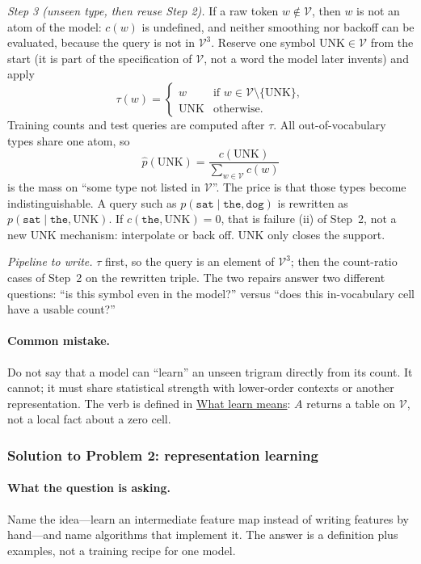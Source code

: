 \documentclass[11pt,a4paper]{article}
\newcommand{\jump}[2]{\hyperref[#1]{#2}}
\theoremstyle{definition}
\begin{document}
\textit{Step 3 (unseen type, then reuse Step 2).}
If a raw token \(w\notin\mathcal{V}\), then \(w\) is not an atom of the model: \(c(w)\) is undefined, and neither smoothing nor backoff can be evaluated, because the query is not in \(\mathcal{V}^3\). Reserve one symbol \(\mathrm{UNK}\in\mathcal{V}\) from the start (it is part of the specification of \(\mathcal{V}\), not a word the model later invents) and apply
\[
\tau(w)
=
\begin{cases}
w & \text{if }w\in\mathcal{V}\setminus\{\mathrm{UNK}\},\\
\mathrm{UNK} & \text{otherwise}.
\end{cases}
\]
Training counts and test queries are computed after \(\tau\). All out-of-vocabulary types share one atom, so
\[
\widehat p(\mathrm{UNK})
=\frac{c(\mathrm{UNK})}{\sum_{w\in\mathcal{V}}c(w)}
\]
is the mass on ``some type not listed in \(\mathcal{V}\)''. The price is that those types become indistinguishable. A query such as \(p(\texttt{sat}\mid\texttt{the},\texttt{dog})\) is rewritten as \(p(\texttt{sat}\mid\texttt{the},\mathrm{UNK})\). If \(c(\texttt{the},\mathrm{UNK})=0\), that is failure (ii) of Step~2, not a new UNK mechanism: interpolate or back off. \(\mathrm{UNK}\) only closes the support.

\textit{Pipeline to write.}
\(\tau\) first, so the query is an element of \(\mathcal{V}^3\); then the count-ratio cases of Step~2 on the rewritten triple. The two repairs answer two different questions: ``is this symbol even in the model?'' versus ``does this in-vocabulary cell have a usable count?''

\paragraph{Common mistake.}
Do not say that a model can ``learn'' an unseen trigram directly from its count. It cannot; it must share statistical strength with lower-order contexts or another representation. The verb is defined in \jump{sec:spr2025-learn}{What learn means}: \(A\) returns a table on \(\mathcal{V}\), not a local fact about a zero cell.

\subsubsection{Solution to Problem 2: representation learning}

\paragraph{What the question is asking.}
Name the idea---learn an intermediate feature map instead of writing features by hand---and name algorithms that implement it. The answer is a definition plus examples, not a training recipe for one model.
\end{document}

